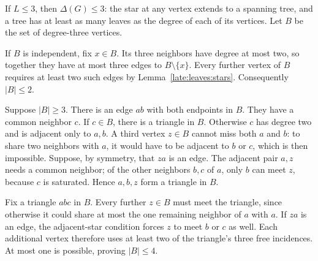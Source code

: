 \documentclass[11pt,a4paper]{article}
\theoremstyle{definition}\newtheorem{definition}[theorem]{Definition}
\theoremstyle{remark}\newtheorem{remark}[theorem]{Remark}
\begin{document}
If $L\le3$, then $\Delta(G)\le3$: the star at any vertex extends to a
spanning tree, and a tree has at least as many leaves as the degree of
each of its vertices. Let $B$ be the set of degree-three vertices.

If $B$ is independent, fix $x\in B$. Its three neighbors have degree at
most two, so together they have at most three edges to $B\setminus\{x\}$.
Every further vertex of $B$ requires at least two such edges by
Lemma~\ref{late:leaves:stars}. Consequently $|B|\le2$.

Suppose $|B|\ge3$. There is an edge $ab$ with both endpoints in $B$.
They have a common neighbor $c$. If $c\in B$, there is a triangle in $B$.
Otherwise $c$ has degree two and is adjacent only to $a,b$. A third
vertex $z\in B$ cannot miss both $a$ and $b$: to share two neighbors with
$a$, it would have to be adjacent to $b$ or $c$, which is then impossible.
Suppose, by symmetry, that $za$ is an edge. The adjacent pair $a,z$ needs
a common neighbor; of the other neighbors $b,c$ of $a$, only $b$ can meet
$z$, because $c$ is saturated. Hence $a,b,z$ form a triangle in $B$.

Fix a triangle $abc$ in $B$. Every further $z\in B$ must meet the
triangle, since otherwise it could share at most the one remaining
neighbor of $a$ with $a$. If $za$ is an edge, the adjacent-star condition
forces $z$ to meet $b$ or $c$ as well. Each additional vertex therefore
uses at least two of the triangle's three free incidences. At most one
is possible, proving $|B|\le4$.
\end{document}
